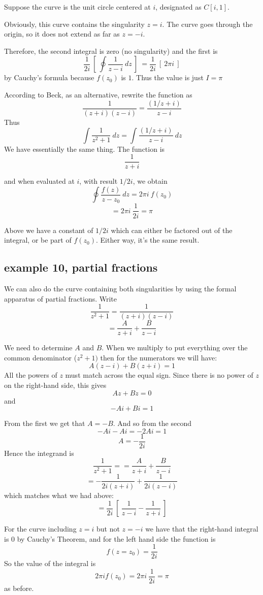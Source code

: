 \documentclass[11pt, oneside]{article}
\begin{document}
Suppose the curve is the unit circle centered at $i$, designated as $C[i,1]$.  

Obviously, this curve contains the singularity $z = i$.  The curve goes through the origin, so it does not extend as far as $z = -i$.

Therefore, the second integral is zero (no singularity) and the first is
\[ \frac{1}{2i} \ [ \ \oint \frac{1}{z - i}  \ dz \ ] \ = \frac{1}{2i} \ [ \  2 \pi i \ ] \]
by Cauchy's formula because $f(z_0)$ is $1$.  Thus the value is just $I = \pi$

According to Beck, as an alternative, rewrite the function as
\[ \frac{1}{(z + i) (z-i)} = \frac{(1/z+i)}{z-i} \]
Thus
\[ \int \frac{1}{z^2 + 1} \ dz = \int \frac{(1/z+i)}{z-i} \ dz \]
We have essentially the same thing.  The function is
\[ \frac{1}{z+i} \]

and when evaluated at $i$, with result $1/2i$, we obtain
\[ \oint  \frac{f(z)}{z-z_0} \ dz = 2 \pi i \ f(z_0) \]
\[ = 2 \pi i \ \frac{1}{2i} = \pi \]

Above we have a constant of $1/2i$ which can either be factored out of the integral, or be part of $f(z_0)$.  Either way, it's the same result.

\subsection*{example 10, partial fractions}

\label{sec:ex10PF}

We can also do the curve containing both singularities by using the formal apparatus of partial fractions.  Write
\[ \frac{1}{z^2 + 1} = \frac{1}{(z+i)(z-i)} \]
\[ = \frac{A}{z+i} + \frac{B}{z-i} \]

We need to determine $A$ and $B$.  When we multiply to put everything over the common denominator ($z^2 + 1)$ then for the numerators we will have:
\[ A(z-i) + B(z+i) = 1 \]
All the powers of $z$ must match across the equal sign.  Since there is no power of $z$ on the right-hand side,  this gives
\[ Az + Bz = 0 \]
and
\[ -Ai + Bi = 1 \]

From the first we get that $A = -B$.  And so from the second
\[ -Ai - Ai = -2Ai = 1 \]
\[ A = -\frac{1}{2i} \]
Hence the integrand is
\[ \frac{1}{z^2 + 1} = = \frac{A}{z+i} + \frac{B}{z-i} \]
\[ = -\frac{1}{2i(z+i)} + \frac{1}{2i(z-i)} \]
which matches what we had above:
\[ = \frac{1}{2i} \ [ \ \frac{1}{z - i} - \frac{1}{z+i} \ ] \]

For the curve including $z = i$ but not $z = -i$ we have that the right-hand integral is 0 by Cauchy's Theorem, and for the left hand side the function is
\[ f(z = z_0) = \frac{1}{2i} \]
So the value of the integral is
\[ 2 \pi i f(z_0) = 2 \pi i \ \frac{1}{2i} = \pi \]
as before.  
\end{document}
